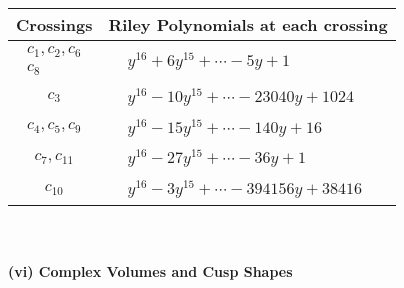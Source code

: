 \documentclass[1p]{elsarticle_modified}
\theoremstyle{definition}
\begin{document}
\begin{tabular}{m{50pt}|m{274pt}}
Crossings & \hspace{64pt}Riley Polynomials at each crossing \\
\hline $$\begin{aligned}c_{1},c_{2},c_{6}\\c_{8}\end{aligned}$$&$\begin{aligned}
&y^{16}+6 y^{15}+\cdots-5 y+1
\end{aligned}$\\
\hline $$\begin{aligned}c_{3}\end{aligned}$$&$\begin{aligned}
&y^{16}-10 y^{15}+\cdots-23040 y+1024
\end{aligned}$\\
\hline $$\begin{aligned}c_{4},c_{5},c_{9}\end{aligned}$$&$\begin{aligned}
&y^{16}-15 y^{15}+\cdots-140 y+16
\end{aligned}$\\
\hline $$\begin{aligned}c_{7},c_{11}\end{aligned}$$&$\begin{aligned}
&y^{16}-27 y^{15}+\cdots-36 y+1
\end{aligned}$\\
\hline $$\begin{aligned}c_{10}\end{aligned}$$&$\begin{aligned}
&y^{16}-3 y^{15}+\cdots-394156 y+38416
\end{aligned}$\\
\hline
\end{tabular}\\~\\
\newpage\flushleft \textbf{(vi) Complex Volumes and Cusp Shapes}
\end{document}
